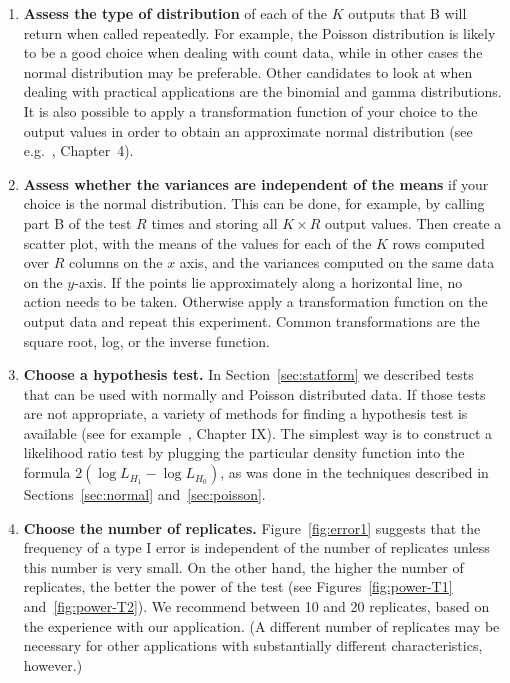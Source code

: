 \begin{enumerate}
\item
\label{assess-type-of-distribution}
{\bf Assess the type of distribution} of each of the $K$ outputs that B will
return when called repeatedly.  For example, the Poisson distribution is
likely to be a good choice when dealing with count data, while in other cases
the normal distribution may be preferable.  Other candidates to look at when
dealing with practical applications are the binomial and gamma
distributions.  It is also possible to apply a transformation function of your
choice to the output values in order to obtain an approximate normal
distribution (see e.g.~\cite{Afifi&2004}, Chapter~4).



\item
\label{assess-variances}
{\bf Assess whether the variances are independent of the means} if your
choice is the normal distribution.  This can be done, for example, by
calling part B of the test $R$ times and storing all $K\times R$ output
values. Then create a scatter plot, with the means of the values for each
of the $K$ rows computed over $R$ columns on the $x$ axis, and the
variances computed on the same data on the $y$-axis.  If the points lie
approximately along a horizontal line, no action needs to be taken.
Otherwise apply a transformation function on the output data and repeat
this experiment.  Common transformations are the square root, log, or the
inverse function.

\item
\label{choose-hypothesis-test}
{\bf Choose a hypothesis test.}  In Section~\ref{sec:statform} we described
tests that can be used with normally and Poisson distributed data. If those
tests are not appropriate, a variety of methods for finding a hypothesis test
is available (see for example~\cite{mood-book-1974}, Chapter IX). The simplest
way is to construct a likelihood ratio test by plugging the particular density
function into the formula $2(\log L_{H_1} - \log L_{H_0})$, as was done in
the techniques described in Sections~\ref{sec:normal} and~\ref{sec:poisson}.

\item
{\bf Choose the number of replicates.}  Figure~\ref{fig:error1} suggests
that the frequency of a type I error is independent of the number of
replicates unless this number is very small. On the other hand, the higher
the number of replicates, the better the power of the test (see
Figures~\ref{fig:power-T1} and~\ref{fig:power-T2}). We recommend between 10
and 20 replicates, based on the experience with our application.  (A
different number of replicates may be necessary for other applications with
substantially different characteristics, however.)


\end{enumerate}
